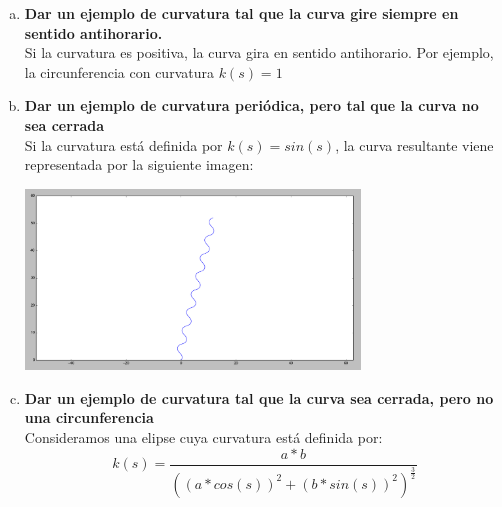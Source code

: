 \documentclass[12pt,a4paper]{article}
\begin{document}
\begin{enumerate}[(a)]
\item \textbf{Dar un ejemplo de curvatura tal que la curva gire siempre
    en sentido antihorario.}\\
  Si la curvatura es positiva, la curva gira en sentido antihorario. Por
  ejemplo, la circunferencia con curvatura $k(s)=1$

\item \textbf{Dar un ejemplo de curvatura periódica, pero tal que la curva
    no sea cerrada}\\
  Si la curvatura está definida por $k(s)=sin(s)$, la curva resultante
  viene representada por la siguiente imagen:\\
  \begin{center}
  \includegraphics[width=0.7\textwidth]{P0/B.png}
  \end{center}

\item \textbf{Dar un ejemplo de curvatura tal que la curva sea cerrada,
    pero no una circunferencia}\\
  Consideramos una elipse cuya curvatura está definida por:
  $$k(s)=\frac{a*b}{((a*cos(s))^{2}+(b*sin(s))^{2})^{\frac{3}{2}}}$$

\end{enumerate}
\end{document}
